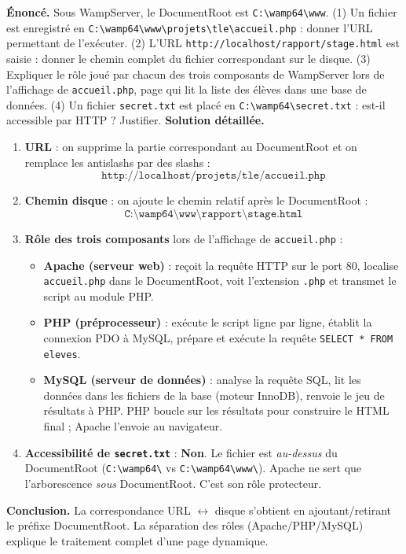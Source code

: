 \documentclass[11pt]{article}
\begin{document}
\begin{exoresolu}
\textbf{Énoncé.} Sous WampServer, le DocumentRoot est \texttt{C:\textbackslash wamp64\textbackslash www}. (1) Un fichier est enregistré en \texttt{C:\textbackslash wamp64\textbackslash www\textbackslash projets\textbackslash tle\textbackslash accueil.php} : donner l'URL permettant de l'exécuter. (2) L'URL \texttt{http://localhost/rapport/stage.html} est saisie : donner le chemin complet du fichier correspondant sur le disque. (3) Expliquer le rôle joué par chacun des trois composants de WampServer lors de l'affichage de \texttt{accueil.php}, page qui lit la liste des élèves dans une base de données. (4) Un fichier \texttt{secret.txt} est placé en \texttt{C:\textbackslash wamp64\textbackslash secret.txt} : est-il accessible par HTTP ? Justifier.
\tcblower
\textbf{Solution détaillée.}
\begin{enumerate}
\item \textbf{URL} : on supprime la partie correspondant au DocumentRoot et on remplace les antislashs par des slashs :
\[ \texttt{http://localhost/projets/tle/accueil.php} \]
\item \textbf{Chemin disque} : on ajoute le chemin relatif après le DocumentRoot :
\[ \texttt{C:\textbackslash wamp64\textbackslash www\textbackslash rapport\textbackslash stage.html} \]
\item \textbf{Rôle des trois composants} lors de l'affichage de \texttt{accueil.php} :
\begin{itemize}
\item \textbf{Apache (serveur web)} : reçoit la requête HTTP sur le port 80, localise \texttt{accueil.php} dans le DocumentRoot, voit l'extension \texttt{.php} et transmet le script au module PHP.
\item \textbf{PHP (préprocesseur)} : exécute le script ligne par ligne, établit la connexion PDO à MySQL, prépare et exécute la requête \texttt{SELECT * FROM eleves}.
\item \textbf{MySQL (serveur de données)} : analyse la requête SQL, lit les données dans les fichiers de la base (moteur InnoDB), renvoie le jeu de résultats à PHP. PHP boucle sur les résultats pour construire le HTML final ; Apache l'envoie au navigateur.
\end{itemize}
\item \textbf{Accessibilité de \texttt{secret.txt}} : \textbf{Non}. Le fichier est \emph{au-dessus} du DocumentRoot (\texttt{C:\textbackslash wamp64\textbackslash} vs \texttt{C:\textbackslash wamp64\textbackslash www\textbackslash}). Apache ne sert que l'arborescence \emph{sous} DocumentRoot. C'est son rôle protecteur.
\end{enumerate}
\textbf{Conclusion.} La correspondance URL $\leftrightarrow$ disque s'obtient en ajoutant/retirant le préfixe DocumentRoot. La séparation des rôles (Apache/PHP/MySQL) explique le traitement complet d'une page dynamique.
\end{exoresolu}
\end{document}
